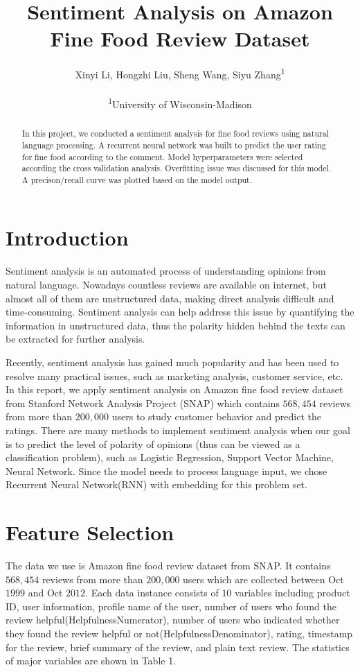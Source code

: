 \documentclass[letterpaper]{article} %
\title{Sentiment Analysis on Amazon Fine Food Review Dataset}
\author{Xinyi Li, Hongzhi Liu, Sheng Wang, Siyu Zhang\textsuperscript{\rm 1}\\ \\ %
\textsuperscript{\rm 1}University of Wisconsin-Madison\\ %
}
\begin{document}
\maketitle

\begin{abstract}
In this project, we conducted a sentiment analysis for fine food reviews using natural language processing. A recurrent neural network was built to predict the user rating for fine food according to the comment. Model hyperparameters were selected according the cross validation analysis. Overfitting issue was discussed for this model. A precison/recall curve was plotted based on the model output. 

\end{abstract}


\section{Introduction}

Sentiment analysis is an automated process of understanding opinions from natural language. Nowadays countless reviews are available on internet, but almost all of them are unstructured data, making direct analysis difficult and time-consuming. Sentiment analysis can help address this issue by quantifying the information in unstructured data, thus the polarity hidden behind the texts can be extracted for further analysis. 

Recently, sentiment analysis has gained much popularity and has been used to resolve many practical issues, such as marketing analysis, customer service, etc. In this report, we apply sentiment analysis on Amazon fine food review dataset from Stanford Network Analysis Project (SNAP) which contains $568,454$ reviews from more than $200,000$ users to study customer behavior and predict the ratings. There are many methods to implement sentiment analysis when our goal is to predict the level of polarity of opinions (thus can be viewed as a classification problem), such as Logistic Regression, Support Vector Machine, Neural Network. Since the model needs to process language input, we chose Recurrent Neural Network(RNN) with embedding for this problem set.

\section{Feature Selection}

The data we use is Amazon fine food review dataset from SNAP. It contains $568,454$ reviews from more than $200,000$ users which are collected between Oct $1999$ and Oct $2012$. Each data instance consists of $10$ variables including product ID, user information, profile name of the user, number of users who found the review helpful(HelpfulnessNumerator), number of users who indicated whether they found the review helpful or not(HelpfulnessDenominator), rating, timestamp for the review, brief summary of the review, and plain text review. The statistics of major variables are shown in Table 1.
\end{document}
